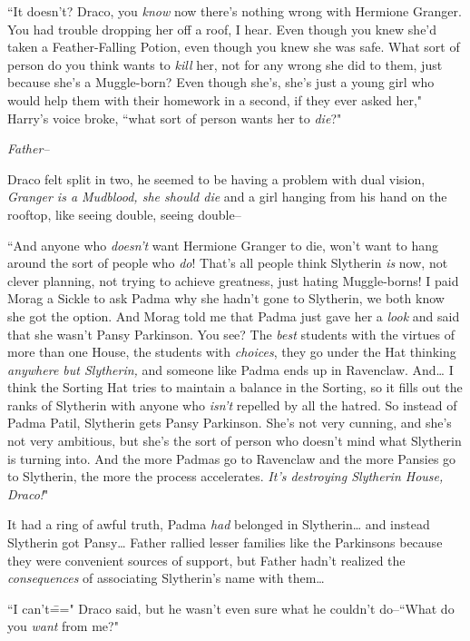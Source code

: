``It doesn't? Draco, you \emph{know} now there's nothing wrong with Hermione Granger. You had trouble dropping her off a roof, I hear. Even though you knew she'd taken a Feather-Falling Potion, even though you knew she was safe. What sort of person do you think wants to \emph{kill} her, not for any wrong she did to them, just because she's a Muggle-born? Even though she's, she's just a young girl who would help them with their homework in a second, if they ever asked her," Harry's voice broke, ``what sort of person wants her to \emph{die}?"

\emph{Father\---}

Draco felt split in two, he seemed to be having a problem with dual vision, \emph{Granger is a Mudblood, she should die} and a girl hanging from his hand on the rooftop, like seeing double, seeing double\---

``And anyone who \emph{doesn't} want Hermione Granger to die, won't want to hang around the sort of people who \emph{do}! That's all people think Slytherin \emph{is} now, not clever planning, not trying to achieve greatness, just hating Muggle-borns! I paid Morag a Sickle to ask Padma why she hadn't gone to Slytherin, we both know she got the option. And Morag told me that Padma just gave her a \emph{look} and said that she wasn't Pansy Parkinson. You see? The \emph{best} students with the virtues of more than one House, the students with \emph{choices}, they go under the Hat thinking \emph{anywhere but Slytherin,} and someone like Padma ends up in Ravenclaw. And{\ldots} I think the Sorting Hat tries to maintain a balance in the Sorting, so it fills out the ranks of Slytherin with anyone who \emph{isn't} repelled by all the hatred. So instead of Padma Patil, Slytherin gets Pansy Parkinson. She's not very cunning, and she's not very ambitious, but she's the sort of person who doesn't mind what Slytherin is turning into. And the more Padmas go to Ravenclaw and the more Pansies go to Slytherin, the more the process accelerates. \emph{It's destroying Slytherin House, Draco!}"

It had a ring of awful truth, Padma \emph{had} belonged in Slytherin{\ldots} and instead Slytherin got Pansy{\ldots} Father rallied lesser families like the Parkinsons because they were convenient sources of support, but Father hadn't realized the \emph{consequences} of associating Slytherin's name with them{\ldots}

``I can't\===" Draco said, but he wasn't even sure what he couldn't do\---``What do you \emph{want} from me?"

